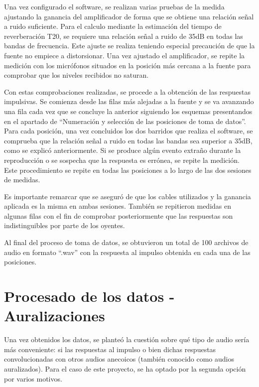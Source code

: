 \documentclass[11pt,a4paper,twoside]{book}
\begin{document}
            Una vez configurado el software, se realizan varias pruebas de la medida ajustando la ganancia del amplificador de forma que se obtiene una relación señal a ruido suficiente. Para el calculo mediante la estimación del tiempo de reverberación T20, se requiere una relación señal a ruido de 35dB en todas las bandas de frecuencia. Este ajuste se realiza teniendo especial precaución de que la fuente no empiece a distorsionar. Una vez ajustado el amplificador, se repite la medición con los micrófonos situados en la posición más cercana a la fuente para comprobar que los niveles recibidos no saturan.
        
            Con estas comprobaciones realizadas, se procede a la obtención de las respuestas impulsivas. Se comienza desde las filas más alejadas a la fuente y se va avanzando una fila cada vez que se concluye la anterior siguiendo los esquemas presentandos en el apartado de ``Numeración y selección de las posiciones de toma de datos''. Para cada posición, una vez concluidos los dos barridos que realiza el software, se comprueba que la relación señal a ruido en todas las bandas sea superior a 35dB, como se explicó anteriormente. Si se produce algún evento extraño durante la reproducción o se sospecha que la respuesta es errónea, se repite la medición. Este procedimiento se repite en todas las posiciones a lo largo de las dos sesiones de medidas.
        
            Es importante remarcar que se aseguró de que los cables utilizados y la ganancia aplicada es la misma en ambas sesiones. También se repitieron medidas en algunas filas con el fin de comprobar posteriormente que las respuestas son indistinguibles por parte de los oyentes.
        
            Al  final del proceso de toma de datos, se obtuvieron un total de 100 archivos de audio en formato ``.wav'' con la respuesta al impulso obtenida en cada una de las posiciones.
            
            \section{Procesado de los datos - Auralizaciones}
                Una vez obtenidos los datos, se planteó la cuestión sobre qué tipo de audio sería más conveniente: si las respuestas al impulso o bien dichas respuestas convolucionadas con otros audios anecoicos (también conocido como audios auralizados). Para el caso de este proyecto, se ha optado por la segunda opción por varios motivos.
        
\end{document}
